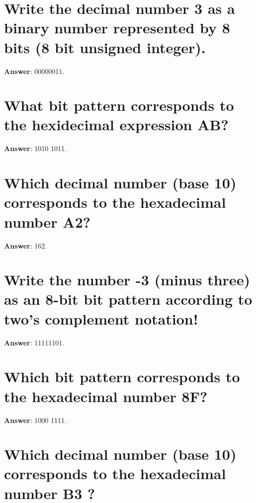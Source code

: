 \documentclass[a4paper,11pt,oneside]{book}
\begin{document}
\begin{sloppypar}
\section{Write the decimal number 3 as a binary number represented by 8 bits (8 bit unsigned integer).}

\label{q:360:sa:en:True}

\textbf{Answer}: 00000011.



\section{What bit pattern corresponds to the hexidecimal expression AB?}

\label{q:361:sa:en:True}

\textbf{Answer}: 1010 1011.



\section{Which decimal number (base 10) corresponds to the hexadecimal number  A2?}

\label{q:362:sa:en:True}

\textbf{Answer}: 162.



\section{Write the number -3 (minus three) as an 8-bit bit pattern according to two's complement notation!}

\label{q:363:sa:en:True}

\textbf{Answer}: 11111101.



\section{Which bit pattern corresponds to the hexadecimal number 8F?}

\label{q:364:sa:en:True}

\textbf{Answer}: 1000 1111.



\section{Which decimal number (base 10) corresponds to the hexadecimal number  B3 ?}


\end{sloppypar}
\end{document}
